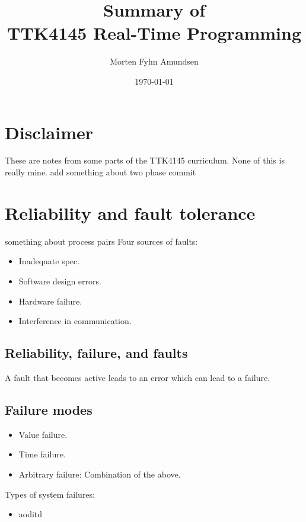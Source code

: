 \documentclass[a4paper, 12pt]{article}
\title{Summary of\\TTK4145 Real-Time Programming}
\date{\today}
\author{Morten Fyhn Amundsen}
\affil{NTNU}
\newcommand{\comment}[1]{\textcolor{RedOrange}{#1}}
\begin{document}
\maketitle
\tableofcontents

\section{Disclaimer}
These are notes from some parts of the TTK4145 curriculum. None of this is really mine.
\comment{add something about two phase commit}



\section{Reliability and fault tolerance}
\comment{something about process pairs}
Four sources of faults:
\begin{itemize}
	\item Inadequate spec.
	\item Software design errors.
	\item Hardware failure.
	\item Interference in communication.
\end{itemize}

\subsection{Reliability, failure, and faults}
A fault that becomes active leads to an error which can lead to a failure.

\subsection{Failure modes}
\begin{itemize}
	\item Value failure.
	\item Time failure.
	\item Arbitrary failure: Combination of the above.
\end{itemize}
Types of system failures:
\begin{itemize}
	\item aoditd
\end{itemize}
\end{document}
